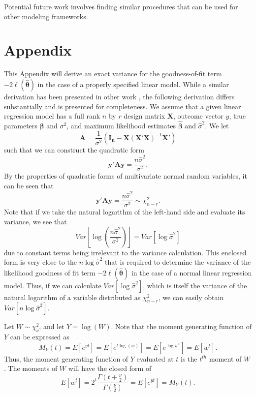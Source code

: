 \documentclass[sn-mathphys-ay]{sn-jnl}
\begin{document}
Potential future work involves finding similar procedures that can be used for other modeling frameworks.

\section{Appendix}
This Appendix will derive an exact variance for the goodness-of-fit term $-2 \ell (\hat{\bm{\theta}} )$ in the case of a properly specified
linear model. While a similar derivation has been presented in other work \citep{McQuarrie}, the following derivation differs substantially and is presented for completeness.
We assume that a given linear regression model has a full rank $n$ by $r$ design matrix $\bm{X}$, outcome vector $y$, true parameters $\bm{\beta}$ and $\sigma^2$,
and maximum likelihood estimates $\hat{\bm{\beta}}$ and $\hat{\sigma}^2$. We let
\begin{equation*}
	\bm{A} = \frac{1}{\sigma^2} (\bm{I_n} - \bm{X}(\bm{X}'\bm{X})^{-1}\bm{X}') 
\end{equation*}
such that we can construct the quadratic form
\begin{equation*}
	\bm{y'Ay} = \frac{n \hat{\sigma}^2}{\sigma^2} .
\end{equation*}
By the properties of quadratic forms of multivariate normal random variables, it can be seen that
\begin{equation}
	\bm{y'Ay} = \frac{n \hat{\sigma}^2}{\sigma^2} \sim \chi^2_{n-r} .
\end{equation}
Note that if we take the natural logarithm of the left-hand side and evaluate its variance, we see that
\begin{equation}
	Var \left[ \log(\frac{n \hat{\sigma}^2}{\sigma^2}) \right]  = Var \left[ \log \hat{\sigma}^2 \right]
\end{equation}
due to constant terms being irrelevant to the variance calculation. This enclosed form is very close to the $n \log \hat{\sigma}^2$ that is required
to determine the variance of the likelihood goodness of fit term $-2 \ell (\hat{\bm{\theta}} )$ in the case of a normal linear regression model.
Thus, if we can calculate $Var \left[ \log \hat{\sigma}^2 \right]$, which is itself the variance
of the natural logarithm of a variable distributed as $\chi^2_{n-r}$, we can easily obtain $Var \left[ n \log \hat{\sigma}^2 \right]$.

Let $W \sim \chi^2_{\nu}$, and let $Y = \log(W)$. Note that the moment generating function of $Y$ can be expressed as
\begin{equation*}
	M_Y (t) = E \left[ e^{yt} \right] = E \left[ e^{t\log(w)} \right] = E \left[ e^{\log w^t} \right] = E \left[ w^t \right] .
\end{equation*}
Thus, the moment generating function of $Y$ evaluated at $t$ is the $t^{th}$ moment of $W$. The moments of $W$ will have the
closed form of
\begin{equation*}
	E \left[ w^t \right] = 2^t \frac{\Gamma (t + \frac{\nu}{2})}{\Gamma (\frac{\nu}{2})} = E \left[ e^{yt} \right] = M_Y (t) .
\end{equation*}
\end{document}
